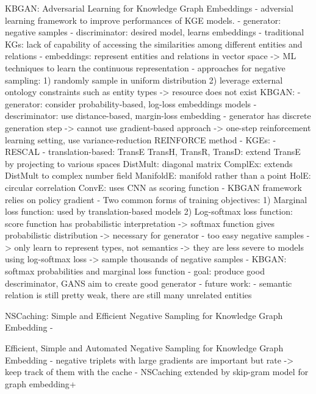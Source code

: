 \cite{cai2017kbgan}
KBGAN: Adversarial Learning for Knowledge Graph Embeddings
- adversial learning framework to improve performances of KGE models.
- generator: negative samples
- discriminator: desired model, learns embeddings
- traditional KGs: lack of capability of accessing the similarities among different entities and relations
- embeddings: represent entities and relations in vector space -> ML techniques to learn the continuous representation
- approaches for negative sampling:
1) randomly sample in uniform distribution
2) leverage external ontology constraints such as entity types
-> resource does not exist
KBGAN:
- generator: consider probability-based, log-loss embeddings models 
- descriminator: use distance-based, margin-loss embedding
- generator has discrete generation step -> cannot use gradient-based approach
-> one-step reinforcement learning setting, use variance-reduction REINFORCE method 
- KGEs: 
    - RESCAL
    - translation-based:
        TransE
        TransH, TransR, TransD: extend TransE by projecting to various spaces
        DistMult: diagonal matrix
        ComplEx: extends DistMult to complex number field
        ManifoldE: manifold rather than a point
        HolE: circular correlation
        ConvE: uses CNN as scoring function
- KBGAN framework relies on policy gradient
- Two common forms of training objectives:
    1) Marginal loss function: used by translation-based models
    2) Log-softmax loss function: score function has probabilistic interpretation
    -> softmax function gives probabilistic distribution -> necessary for generator
- too easy negative samples -> only learn to represent types, not semantics
-> they are less severe to models using log-softmax loss -> sample thousands of negative samples
- KBGAN: softmax probabilities and marginal loss function
- goal: produce good descriminator, GANS aim to create good generator
- future work:
    - semantic relation is still pretty weak, there are still many unrelated entities 
 
\cite{zhang2019nscaching}
NSCaching: Simple and Efficient Negative Sampling for Knowledge Graph Embedding
-



    
\cite{zhang2020efficient}
Efficient, Simple and Automated Negative Sampling for Knowledge Graph Embedding
- negative triplets with large gradients are important but rate 
-> keep track of them with the cache
- NSCaching extended by skip-gram model for graph embedding+






